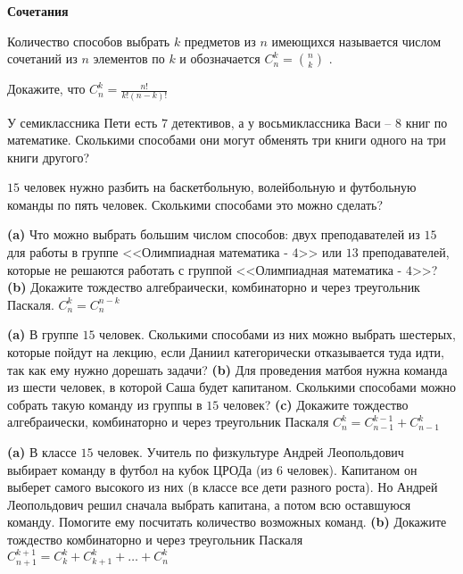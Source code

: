 \documentclass{article}
\begin{document}
    \large

    \begin{center}
        \textbf{Сочетания}
    \end{center}

    \begin{definition}
        Количество способов выбрать $k$ предметов из $n$ имеющихся называется числом сочетаний из $n$ элементов по $k$ и обозначается $C^k_n = \binom{n}{k}$ .
    \end{definition}

    \begin{enumerate_boxed}
        \item Докажите, что $C^k_n = \frac{n!}{k!(n - k)!}$

        \item У семиклассника Пети есть $7$ детективов, а у восьмиклассника Васи – $8$ книг по математике.
        Сколькими способами они могут обменять три книги одного на три книги другого?

        \item $15$ человек нужно разбить на баскетбольную, волейбольную и футбольную команды по пять человек.
        Сколькими способами это можно сделать?

        \item \textbf{(a)} Что можно выбрать большим числом способов: двух преподавателей из $15$ для работы
        в группе <<Олимпиадная математика - $4$>> или $13$ преподавателей, которые не решаются работать с группой <<Олимпиадная математика - $4$>>? \textbf{(b)} Докажите тождество алгебраически, комбинаторно и через треугольник Паскаля. $C^k_n = C^{n-k}_n$

        \item \textbf{(a)} В группе $15$ человек.
        Сколькими способами из них можно выбрать шестерых, которые пойдут на лекцию, если Даниил категорически отказывается туда идти, так как ему нужно дорешать задачи? \textbf{(b)} Для проведения матбоя нужна команда из шести человек, в которой Саша будет капитаном.
        Сколькими способами можно собрать такую команду из группы в $15$ человек? \textbf{(c)} Докажите тождество алгебраически, комбинаторно и через треугольник Паскаля $C^k_n = C^{k-1}_{n - 1} + C^k_{n- 1}$

        \item \textbf{(a)} В классе $15$ человек.
        Учитель по физкультуре Андрей Леопольдович выбирает команду в футбол на кубок ЦРОДа (из 6 человек).
        Капитаном он выберет самого высокого из них (в классе все дети разного роста).
        Но Андрей Леопольдович решил сначала выбрать капитана, а потом всю оставшуюся команду.
        Помогите ему посчитать количество возможных команд. \textbf{(b)} Докажите тождество комбинаторно и через треугольник Паскаля $C^{k + 1}_{n + 1} = C^{k}_{k} + C^{k}_{k + 1} + \dotso + C^k_{n}$


\end{enumerate_boxed}
\end{document}
